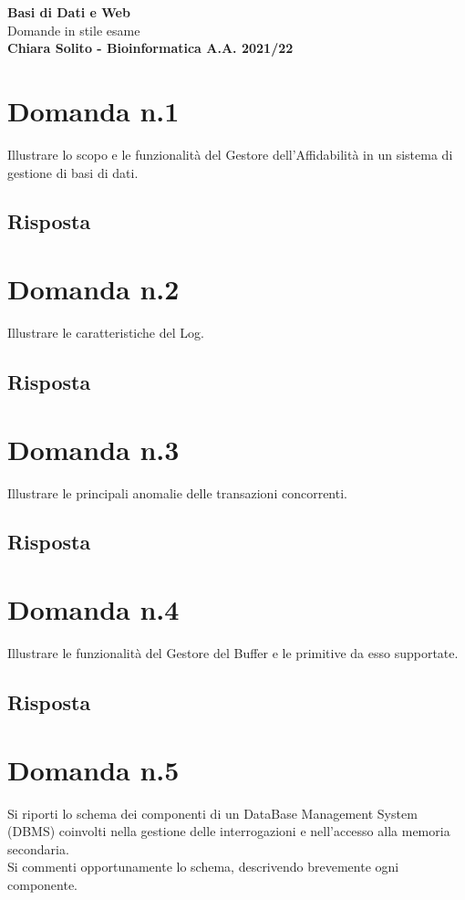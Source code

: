 \documentclass{article}
\begin{document}
    \begin{center}
        \vspace{0.5cm}
        \LARGE
        \textbf{Basi di Dati e Web\\}
        Domande in stile esame\\
        \vspace{0.5cm}
        \small
        \textbf{Chiara Solito - Bioinformatica A.A. 2021/22}
    \end{center}


\section*{Domanda n.1}
Illustrare lo scopo e le funzionalità del Gestore dell'Affidabilità in un sistema di gestione di basi di dati.
\subsection*{Risposta}

\section*{Domanda n.2}
Illustrare le caratteristiche del Log.
\subsection*{Risposta}

\section*{Domanda n.3}
Illustrare le principali anomalie delle transazioni concorrenti.
\subsection*{Risposta}

\section*{Domanda n.4}
Illustrare le funzionalità del Gestore del Buffer e le primitive da esso supportate.
\subsection*{Risposta}

\section*{Domanda n.5}
Si riporti lo schema dei componenti di un DataBase Management System (DBMS) coinvolti nella gestione delle
interrogazioni e nell'accesso alla memoria secondaria.\\
Si commenti opportunamente lo schema, descrivendo brevemente ogni componente.
\end{document}
